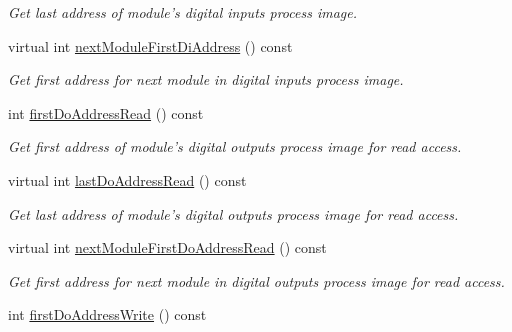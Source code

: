 \begin{DoxyCompactItemize}
\begin{DoxyCompactList}\small\item\em Get last address of module's digital inputs process image. \end{DoxyCompactList}\item 
\hypertarget{classmdt_device_modbus_wago_module_ad789bd289b2969f4c8291dd4f5c543c0}{
virtual int \hyperlink{classmdt_device_modbus_wago_module_ad789bd289b2969f4c8291dd4f5c543c0}{nextModuleFirstDiAddress} () const }
\label{classmdt_device_modbus_wago_module_ad789bd289b2969f4c8291dd4f5c543c0}

\begin{DoxyCompactList}\small\item\em Get first address for next module in digital inputs process image. \end{DoxyCompactList}\item 
\hypertarget{classmdt_device_modbus_wago_module_ac7279bc692cba522a5e06abfec5012a9}{
int \hyperlink{classmdt_device_modbus_wago_module_ac7279bc692cba522a5e06abfec5012a9}{firstDoAddressRead} () const }
\label{classmdt_device_modbus_wago_module_ac7279bc692cba522a5e06abfec5012a9}

\begin{DoxyCompactList}\small\item\em Get first address of module's digital outputs process image for read access. \end{DoxyCompactList}\item 
\hypertarget{classmdt_device_modbus_wago_module_a842c9dcad712703dfa9e5736a1e3c215}{
virtual int \hyperlink{classmdt_device_modbus_wago_module_a842c9dcad712703dfa9e5736a1e3c215}{lastDoAddressRead} () const }
\label{classmdt_device_modbus_wago_module_a842c9dcad712703dfa9e5736a1e3c215}

\begin{DoxyCompactList}\small\item\em Get last address of module's digital outputs process image for read access. \end{DoxyCompactList}\item 
\hypertarget{classmdt_device_modbus_wago_module_aa2efef403e1f92e8e4a8195d7568b116}{
virtual int \hyperlink{classmdt_device_modbus_wago_module_aa2efef403e1f92e8e4a8195d7568b116}{nextModuleFirstDoAddressRead} () const }
\label{classmdt_device_modbus_wago_module_aa2efef403e1f92e8e4a8195d7568b116}

\begin{DoxyCompactList}\small\item\em Get first address for next module in digital outputs process image for read access. \end{DoxyCompactList}\item 
\hypertarget{classmdt_device_modbus_wago_module_a31165c5734801029ea530be8774da5de}{
int \hyperlink{classmdt_device_modbus_wago_module_a31165c5734801029ea530be8774da5de}{firstDoAddressWrite} () const }
\label{classmdt_device_modbus_wago_module_a31165c5734801029ea530be8774da5de}


\end{DoxyCompactItemize}
